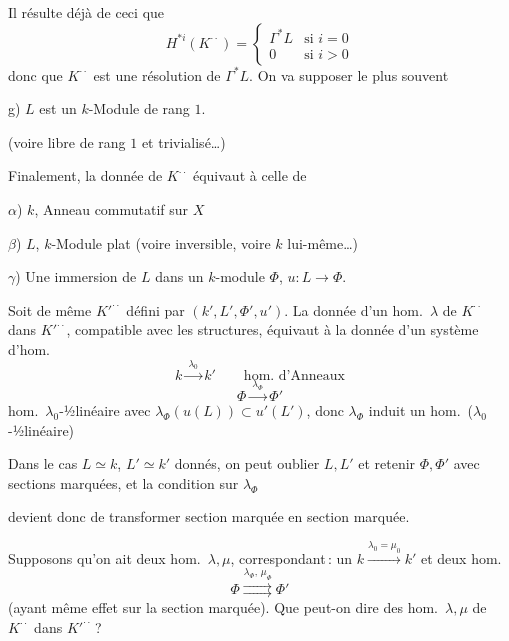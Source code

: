 \documentclass[11pt,a4paper]{article}
\begin{document}
Il résulte déjà de ceci que
\[
  H^{*i}(K^{\cdot\cdot})=
  \begin{cases}
    \Gamma^{*}L & \text{si } i=0\\
    0 & \text{si } i>0
  \end{cases}
\]
donc que $K^{\cdot\cdot}$ est une résolution de $\Gamma^{*}L$. On va supposer
le plus souvent

g) $L$ est un $k$-Module   de rang $1$.

(voire libre de rang $1$ et trivialisé…)


Finalement, la donnée de $K^{\cdot\cdot}$ équivaut à celle de

$\alpha$) $k$, Anneau commutatif sur $X$

$\beta$) $L$, $k$-Module plat (voire inversible, voire $k$ lui-même…)

$\gamma$) Une immersion de $L$ dans un $k$-module $\Phi$, $u\colon L\to\Phi$.

Soit de même $K'^{\cdot\cdot}$ défini par $(k',L',\Phi',u')$. La donnée d'un
hom.\ $\lambda$ de $K^{\cdot\cdot}$ dans $K'^{\cdot\cdot}$, compatible avec les
structures, équivaut à la donnée d'un système d'hom.
\[
  k\xrightarrow{\ \lambda_{0}\ }k'\qquad\text{hom.\ d'Anneaux}
\]
\[
  \Phi\xrightarrow{\ \lambda_{\Phi}\ }\Phi'
\]
hom.\ $\lambda_{0}$-½linéaire
avec $\lambda_{\Phi}(u(L))\subset u'(L')$, \struck{\ill{}} donc
$\lambda_{\Phi}$ induit un hom.\ ($\lambda_{0}$-½linéaire)



Dans le cas $L\simeq k$, $L'\simeq k'$ donnés, on peut oublier $L,L'$ et
retenir $\Phi,\Phi'$ avec sections marquées, et la condition sur
$\lambda_{\Phi}$

devient donc de transformer section marquée en section marquée.

Supposons qu'on ait deux hom.\ $\lambda,\mu$, correspondant\,: un
$k\xrightarrow{\lambda_{0}=\mu_{0}}k'$ et deux hom.
\[
  \Phi\overset{\lambda_{\Phi},\,\mu_{\Phi}}{\rightrightarrows}\Phi'
\]
(ayant même effet sur la section marquée). Que peut-on dire des hom.\
$\lambda,\mu$ de $K^{\cdot\cdot}$ dans $K'^{\cdot\cdot}$\,?
\end{document}
